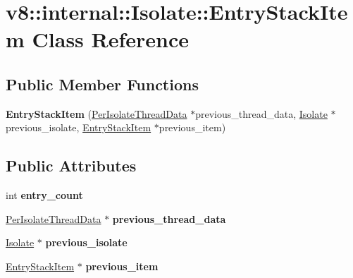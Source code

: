 \hypertarget{classv8_1_1internal_1_1_isolate_1_1_entry_stack_item}{}\section{v8\+:\+:internal\+:\+:Isolate\+:\+:Entry\+Stack\+Item Class Reference}
\label{classv8_1_1internal_1_1_isolate_1_1_entry_stack_item}
\subsection*{Public Member Functions}
\begin{DoxyCompactItemize}
\item 
{\bfseries Entry\+Stack\+Item} (\hyperlink{classv8_1_1internal_1_1_isolate_1_1_per_isolate_thread_data}{Per\+Isolate\+Thread\+Data} $\ast$previous\+\_\+thread\+\_\+data, \hyperlink{classv8_1_1internal_1_1_isolate}{Isolate} $\ast$previous\+\_\+isolate, \hyperlink{classv8_1_1internal_1_1_isolate_1_1_entry_stack_item}{Entry\+Stack\+Item} $\ast$previous\+\_\+item)\hypertarget{classv8_1_1internal_1_1_isolate_1_1_entry_stack_item_ac28efffe69ed3b385f4f8125a24e3a00}{}\label{classv8_1_1internal_1_1_isolate_1_1_entry_stack_item_ac28efffe69ed3b385f4f8125a24e3a00}

\end{DoxyCompactItemize}
\subsection*{Public Attributes}
\begin{DoxyCompactItemize}
\item 
int {\bfseries entry\+\_\+count}\hypertarget{classv8_1_1internal_1_1_isolate_1_1_entry_stack_item_a3f1bd07926cb22caa3500c49ea0b0d09}{}\label{classv8_1_1internal_1_1_isolate_1_1_entry_stack_item_a3f1bd07926cb22caa3500c49ea0b0d09}

\item 
\hyperlink{classv8_1_1internal_1_1_isolate_1_1_per_isolate_thread_data}{Per\+Isolate\+Thread\+Data} $\ast$ {\bfseries previous\+\_\+thread\+\_\+data}\hypertarget{classv8_1_1internal_1_1_isolate_1_1_entry_stack_item_a042d5aa3790affd091751eb9649e765f}{}\label{classv8_1_1internal_1_1_isolate_1_1_entry_stack_item_a042d5aa3790affd091751eb9649e765f}

\item 
\hyperlink{classv8_1_1internal_1_1_isolate}{Isolate} $\ast$ {\bfseries previous\+\_\+isolate}\hypertarget{classv8_1_1internal_1_1_isolate_1_1_entry_stack_item_a9f30940b25d63c8facdf87ff6b4826dd}{}\label{classv8_1_1internal_1_1_isolate_1_1_entry_stack_item_a9f30940b25d63c8facdf87ff6b4826dd}

\item 
\hyperlink{classv8_1_1internal_1_1_isolate_1_1_entry_stack_item}{Entry\+Stack\+Item} $\ast$ {\bfseries previous\+\_\+item}\hypertarget{classv8_1_1internal_1_1_isolate_1_1_entry_stack_item_aeaed0ee4941fe253023f3f84d34b5327}{}\label{classv8_1_1internal_1_1_isolate_1_1_entry_stack_item_aeaed0ee4941fe253023f3f84d34b5327}

\end{DoxyCompactItemize}
